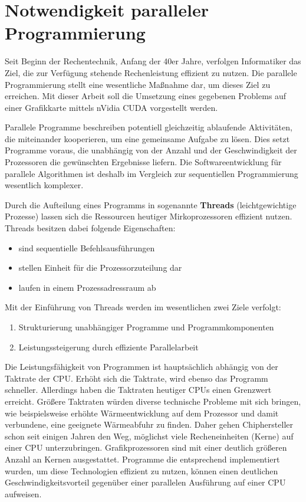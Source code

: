 
\chapter{Notwendigkeit paralleler Programmierung}
\label{intro}
Seit Beginn der Rechentechnik, Anfang der 40er Jahre, verfolgen Informatiker das Ziel, die zur Verfügung stehende Rechenleistung effizient zu nutzen.
Die parallele Programmierung stellt eine wesentliche Maßnahme dar, um dieses Ziel zu erreichen. Mit dieser Arbeit soll die Umsetzung eines gegebenen Problems auf einer Grafikkarte mittels nVidia CUDA vorgestellt werden.

Parallele Programme beschreiben potentiell gleichzeitig ablaufende Aktivitäten, die miteinander kooperieren, um eine gemeinsame Aufgabe zu lösen. Dies setzt Programme voraus, die unabhängig von der Anzahl und der Geschwindigkeit der Prozessoren die gewünschten Ergebnisse liefern. Die Softwareentwicklung für parallele Algorithmen ist deshalb im Vergleich zur sequentiellen Programmierung wesentlich komplexer.

Durch die Aufteilung eines Programms in sogenannte \textbf{Threads} (\glqq leichtgewichtige Prozesse\grqq) lassen sich die Ressourcen heutiger Mirkoprozessoren effizient nutzen.
Threads besitzen dabei folgende Eigenschaften:
\begin{itemize}
\item sind sequentielle Befehlsausführungen
\item stellen Einheit für die Prozessorzuteilung dar
\item laufen in einem Prozessadressraum ab
\end{itemize}
Mit der Einführung von Threads werden im wesentlichen zwei Ziele verfolgt:
\begin{enumerate}
\item Strukturierung unabhängiger Programme und Programmkomponenten
\item Leistungssteigerung durch effiziente Parallelarbeit
\end{enumerate}

Die Leistungsfähigkeit von Programmen ist hauptsächlich abhängig von der Taktrate der CPU. Erhöht sich die Taktrate, wird ebenso das Programm schneller.
Allerdings haben die Taktraten heutiger CPUs einen Grenzwert erreicht.
Größere Taktraten würden diverse technische Probleme mit sich bringen, wie beispielsweise erhöhte Wärmeentwicklung auf dem Prozessor und damit verbundene, eine geeignete Wärmeabfuhr zu finden.
Daher gehen Chiphersteller schon seit einigen Jahren den Weg, möglichst viele Recheneinheiten (Kerne) auf einer CPU unterzubringen. Grafikprozessoren sind mit einer deutlich größeren Anzahl an Kernen ausgestattet.
Programme die entsprechend implementiert wurden, um diese Technologien effizient zu nutzen, können einen deutlichen Geschwindigkeitsvorteil gegenüber einer parallelen Ausführung auf einer CPU aufweisen.


